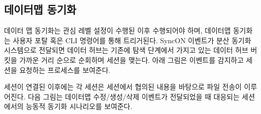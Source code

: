 \documentclass[a4paper,10pt,english]{sphinxmanual}
\begin{document}

\begin{DUlineblock}{0em}
\item[] 
\end{DUlineblock}


\begin{DUlineblock}{0em}
\item[] 
\end{DUlineblock}


\subsection{데이터맵 동기화}
\label{\detokenize{intro:id11}}
\sphinxAtStartPar
데이터 맵 동기화는 관심 레벨 설정이 수행된 이후 수행되어야 하며, 데이터맵 동기화는 사용자 포탈 혹은 CLI 명령어를 통해 트리거된다.
SyncON 이벤트가 분산 동기화 시스템으로 전달되면 데이터 허브는 기존에 탐색 단계에서 가지고 있는 데이터 허브 버킷을 가까운 거리 순으로 순회하며 세션을 맺는다.
아래 그림은  이벤트를 감지하고 세션을 요청하는 프로세스를 보여준다.


\begin{DUlineblock}{0em}
\item[] 
\end{DUlineblock}

\sphinxAtStartPar
세션이 연결된 이후에는 각 세션은 세션에서 협의된 내용을 바탕으로 파일 전송이 이루어진다.
다음 그림는 데이터맵 수정/생성/삭제 이벤트가 전달되었을 때 대응되는 세션에서의 능동적 동기화 시나리오를 보여준다.


\begin{DUlineblock}{0em}
\item[] 
\end{DUlineblock}
\end{document}
